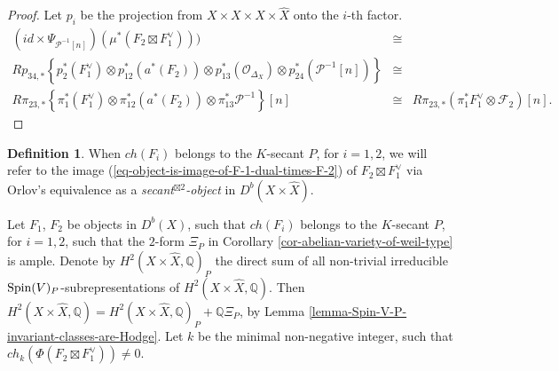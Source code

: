 \documentclass[12pt]{amsart}
\numberwithin{equation}{subsection}
\theoremstyle{plain}
\theoremstyle{definition}
\newtheorem{defi}[thm]{Definition}
\newcommand{\F}{{\mathcal F}}
\newcommand{\QQ}{{\mathbb Q}}
\renewcommand{\P}{{\mathcal P}}
\newcommand{\Spin}{{\rm Spin}}
\newcommand{\StructureSheaf}[1]{{\mathcal O}_{#1}}
\begin{document}
\begin{proof}
Let $p_i$ be the projection from $X\times X\times X\times \hat{X}$ onto the $i$-th factor. 
\begin{eqnarray*}
(id\times\Psi_{\P^{-1}[n]})(\mu^*(F_2\boxtimes F_1^\vee))) & \cong &
\\
Rp_{34,*}\left\{
p_2^*(F_1^\vee)\otimes p_{12}^*(a^*(F_2))\otimes p_{13}^*(\StructureSheaf{\Delta_X})\otimes p_{24}^*(\P^{-1}[n])
\right\} &\cong&
\\
R\pi_{23,*}\left\{
\pi_1^*(F_1^\vee)\otimes \pi_{12}^*(a^*(F_2))\otimes \pi_{13}^*\P^{-1}
\right\}[n] &\cong& 
R\pi_{23,*}(\pi_1^*F_1^\vee\otimes \F_2)[n].
\end{eqnarray*}
\end{proof}

\begin{defi}
\label{def-secant-square-object}
When $ch(F_i)$ belongs to the $K$-secant $P$, for $i=1,2$, 
we will refer to the image (\ref{eq-object-is-image-of-F-1-dual-times-F-2}) of $F_2\boxtimes F_1^\vee$ via Orlov's equivalence as a {\em secant$^{\boxtimes 2}$-object} in $D^b(X\times\hat{X})$.
\end{defi}

Let $F_1$, $F_2$ be objects in $D^b(X)$, such that $ch(F_i)$ belongs to the $K$-secant $P$, for $i=1,2$, such that the $2$-form $\Xi_P$ in Corollary \ref{cor-abelian-variety-of-weil-type} is ample.
Denote by $H^2(X\times\hat{X},\QQ)_P$
the direct sum of all non-trivial irreducible $\Spin(V)_P$-subrepresentations of $H^2(X\times\hat{X},\QQ).$ Then
$H^2(X\times\hat{X},\QQ)=H^2(X\times\hat{X},\QQ)_P+\QQ\Xi_P$, 
by Lemma \ref{lemma-Spin-V-P-invariant-classes-are-Hodge}.
Let $k$ be the minimal non-negative integer, such that $ch_k(\Phi(F_2\boxtimes F_1^\vee))\neq 0.$ 
\end{document}
